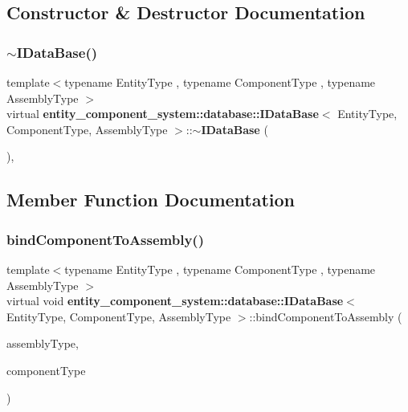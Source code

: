 \subsection{Constructor \& Destructor Documentation}
\label{classentity__component__system_1_1database_1_1_i_data_base_abcbd6e03736ab22392af6a5af784744e} 
\subsubsection{$\sim$\+I\+Data\+Base()}
{\footnotesize\ttfamily template$<$typename Entity\+Type , typename Component\+Type , typename Assembly\+Type $>$ \\
virtual {\bf entity\+\_\+component\+\_\+system\+::database\+::\+I\+Data\+Base}$<$ Entity\+Type, Component\+Type, Assembly\+Type $>$\+::$\sim${\bf I\+Data\+Base} (\begin{DoxyParamCaption}\item[{void}]{ }\end{DoxyParamCaption})\hspace{0.3cm}{\ttfamily [inline]}, {\ttfamily [virtual]}}



\subsection{Member Function Documentation}
\label{classentity__component__system_1_1database_1_1_i_data_base_a6f9eb76615a1bea6d93f562ca2380bae} 
\subsubsection{bind\+Component\+To\+Assembly()}
{\footnotesize\ttfamily template$<$typename Entity\+Type , typename Component\+Type , typename Assembly\+Type $>$ \\
virtual void {\bf entity\+\_\+component\+\_\+system\+::database\+::\+I\+Data\+Base}$<$ Entity\+Type, Component\+Type, Assembly\+Type $>$\+::bind\+Component\+To\+Assembly (\begin{DoxyParamCaption}\item[{Assembly\+Type const}]{assembly\+Type,  }\item[{Component\+Type const}]{component\+Type }\end{DoxyParamCaption})\hspace{0.3cm}{\ttfamily [pure virtual]}}

